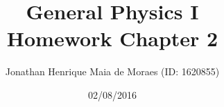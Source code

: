 \title{General Physics I \\ Homework Chapter 2}
\author{Jonathan Henrique Maia de Moraes (ID: 1620855)}
\date{02/08/2016}
\maketitle
